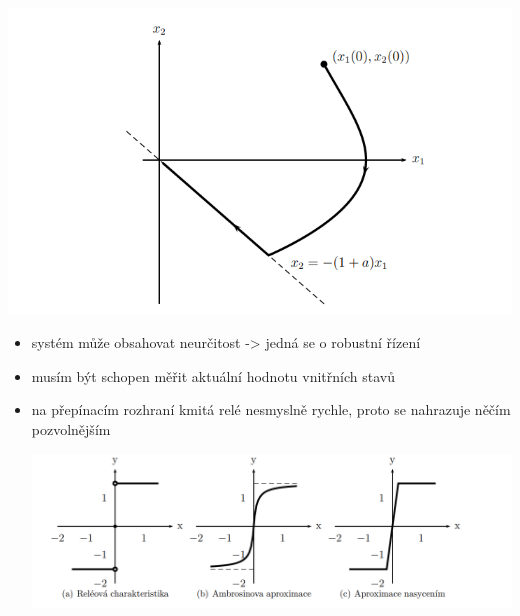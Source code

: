  \includegraphics{img/kluzavy_obr.png}

 \begin{itemize}
    \item systém může obsahovat neurčitost -> jedná se o robustní řízení
    \item musím být schopen měřit aktuální hodnotu vnitřních stavů
    \item na přepínacím rozhraní kmitá relé nesmyslně rychle, proto se nahrazuje něčím pozvolnějším 

    \includegraphics[scale = 0.5]{img/kluzavy_rele.png}

 \end{itemize}

